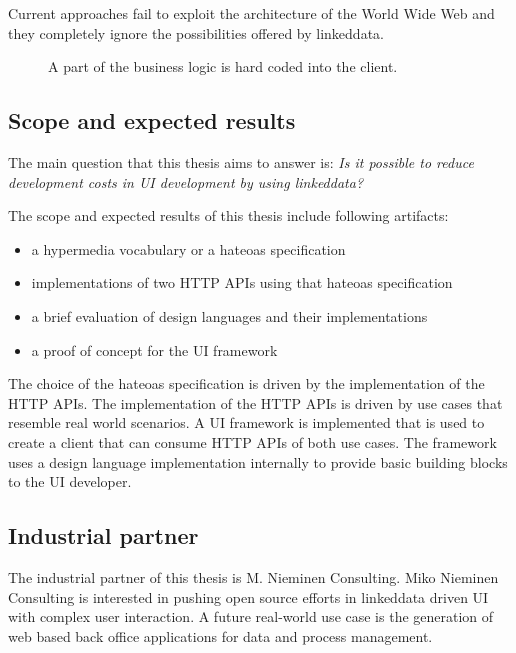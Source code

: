 Current approaches fail to exploit the architecture of the World Wide Web and they completely ignore the possibilities offered by \gls{linkeddata}.

\begin{figure}[!htb]
  \caption{A part of the business logic is hard coded into the client.}
  \label{fig:hardcoded}
\end{figure}

\subsection{Scope and expected results}\label{sec:scope}
The main question that this thesis aims to answer is: \textit{Is it possible to reduce development costs in UI development by using \gls{linkeddata}?}

The scope and expected results of this thesis include following artifacts:

\begin{itemize}
\item a \gls{hypermedia} vocabulary or a \gls{hateoas} specification
\item implementations of two HTTP APIs using that \gls{hateoas} specification
\item a brief evaluation of design languages and their implementations
\item a proof of concept for the UI framework
\end{itemize}

The choice of the \gls{hateoas} specification is driven by the implementation of the HTTP APIs. The implementation of the HTTP APIs is driven by use cases that resemble real world scenarios. A UI framework is implemented that is used to create a client that can consume HTTP APIs of both use cases. The framework uses a design language implementation internally to provide basic building blocks to the UI developer.

\subsection{Industrial partner}
The industrial partner of this thesis is M. Nieminen Consulting. Miko Nieminen Consulting is interested in pushing open source efforts in \gls{linkeddata} driven UI with complex user interaction. A future real-world use case is the generation of web based back office applications for data and process management.
